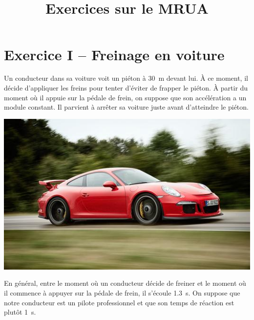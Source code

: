 \documentclass{tufte-handout}
\title{Exercices sur le MRUA}
\date{}
\begin{document}
\maketitle
\vspace{0.5cm}

\section{Exercice I -- Freinage en voiture}

Un conducteur dans sa voiture voit un piéton à \SI{30}{\meter} devant lui.  À
ce moment, il décide d'appliquer les freins pour tenter d'éviter de frapper le
piéton.  À partir du moment où il appuie sur la pédale de frein, on suppose que
son accélération a un module constant.  Il parvient à arrêter sa voiture juste
avant d'atteindre le piéton.

\begin{marginfigure}
  \includegraphics[scale=0.3]{2014porsche911gt3.jpg}
  \caption{Une Porsche 911 GT3 2014 peut freiner avec une accélération de
    module \SI{11.9}{\meter\per\second\squared}.}
  \label{fig:porsche}
\end{marginfigure}

En général, entre le moment où un conducteur décide de freiner et le moment où
il commence à appuyer sur la pédale de frein, il s'écoule \SI{1.3}{\second}.
On suppose que notre conducteur est un pilote professionnel et que son temps de
réaction est plutôt \SI{1}{s}.
\end{document}
